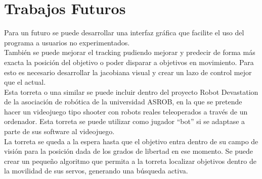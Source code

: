 \newpage


\section{Trabajos Futuros}
Para un futuro se puede desarrollar una interfaz gráfica que facilite el uso del programa a usuarios no experimentados.\\

También se puede mejorar el tracking pudiendo mejorar y predecir de forma más exacta la posición del objetivo o poder disparar a objetivos en movimiento. Para esto es necesario desarrollar la jacobiana visual y crear un lazo de control mejor que el actual.\\

Esta torreta o una similar se puede incluir dentro del proyecto Robot Devastation de la asociación de robótica de la universidad ASROB, en la que se pretende hacer un videojuego tipo shooter con robots reales teleoperados a través de un ordenador. Esta torreta se puede utilizar como jugador “bot” si se adaptase a parte de sus software al videojuego.\\

La torreta se queda a la espera hasta que el objetivo entra dentro de su campo de visión para la posición dada de los grados de libertad en ese momento. Se puede crear un pequeño algoritmo que permita a la torreta localizar objetivos dentro de la movilidad de sus servos, generando una búsqueda activa.\\
